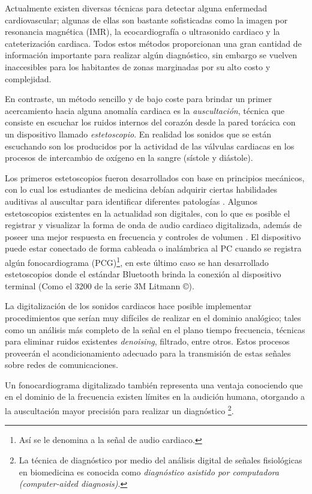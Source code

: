 Actualmente existen diversas técnicas para detectar alguna enfermedad cardiovascular; algunas de ellas son bastante sofisticadas como la imagen por resonancia magnética (IMR), la ecocardiografía o ultrasonido cardiaco y la cateterización cardiaca. Todos estos métodos proporcionan una gran cantidad de información importante para realizar algún diagnóstico, sin embargo se vuelven inaccesibles para los habitantes de zonas marginadas por su alto costo y complejidad.

 En contraste, un método sencillo y de bajo coste para brindar un primer acercamiento hacia alguna anomalía cardiaca es la \emph{auscultación}, técnica que consiste en escuchar los ruidos internos del corazón desde la pared torácica con un dispositivo llamado \emph{estetoscopio}. En realidad los sonidos que se están escuchando son los producidos por la actividad de las válvulas cardiacas en los procesos de intercambio de oxígeno en la sangre (sístole y diástole).
 
Los primeros estetoscopios fueron desarrollados con base en principios mecánicos, con lo cual los estudiantes de medicina debían adquirir ciertas habilidades auditivas al auscultar para identificar diferentes patologías \cite[]{Roguin2006}. Algunos estetoscopios existentes en la actualidad son digitales, con lo que es posible el registrar y visualizar la forma de onda de audio cardiaco digitalizada, además de poseer una mejor respuesta en frecuencia y controles de volumen \cite[]{Abbas2009}. El dispositivo puede estar conectado de forma cableada o inalámbrica al PC cuando se registra algún fonocardiograma (PCG)\footnote {Así se le denomina a la señal de audio cardiaco.}, en este último caso se han desarrollado estetoscopios donde el estándar Bluetooth brinda la conexión al dispositivo terminal (Como el 3200 de la serie 3M Litmann \copyright).

La digitalización de los sonidos cardiacos hace posible implementar procedimientos que serían muy difíciles de realizar en el dominio analógico;  tales como un análisis más completo de la señal en el plano tiempo frecuencia, técnicas para eliminar ruidos existentes \emph{denoising}, filtrado, entre otros. Estos procesos proveerán el acondicionamiento adecuado para la transmisión de estas señales sobre redes de comunicaciones. 

Un fonocardiograma digitalizado también representa una ventaja conociendo que en el dominio de la frecuencia existen límites en la audición humana, otorgando a la auscultación mayor precisión para realizar un diagnóstico \footnote{La técnica de diagnóstico por medio del análisis digital de señales fisiológicas en biomedicina es conocida como \emph{diagnóstico asistido por computadora (computer-aided diagnosis)}\cite[]{Doi2008}.}.

